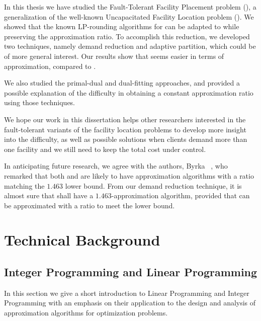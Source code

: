 \documentclass[oneside,final]{ucr}
\begin{document}
In this thesis we have studied the Fault-Tolerant Facility
Placement problem ({\FTFP}), a generalization of the
well-known Uncapacitated Facility Location problem
({\UFL}). We showed that the known LP-rounding algorithms
for {\UFL} can be adapted to {\FTFP} while preserving the
approximation ratio. To accomplish this reduction, we
developed two techniques, namely demand reduction and
adaptive partition, which could be of more general
interest. Our results show that {\FTFP} seems easier in
terms of approximation, compared to {\FTFL}.

We also studied the primal-dual and dual-fitting approaches,
and provided a possible explanation of the difficulty in
obtaining a constant approximation ratio using those
techniques.

We hope our work in this dissertation helps other
researchers interested in the fault-tolerant variants of the
facility location problems to develop more insight into the
difficulty, as well as possible solutions when clients
demand more than one facility and we still need to keep the
total cost under control.

In anticipating future research, we agree with the authors,
Byrka {\etal}~\cite{ByrkaSS10}, who remarked that both
{\UFL} and {\FTFL} are likely to have approximation
algorithms with a ratio matching the $1.463$ lower
bound. From our demand reduction technique, it is almost
sure that {\FTFP} shall have a $1.463$-approximation
algorithm, provided that {\FTFL} can be approximated with a
ratio to meet the lower bound.




\appendix
\chapter{Technical Background}

\section{Integer Programming and Linear Programming}
\label{sec: ILP}

In this section we give a short introduction to Linear
Programming and Integer Programming with an emphasis on
their application to the design and analysis of
approximation algorithms for optimization problems.
\end{document}
